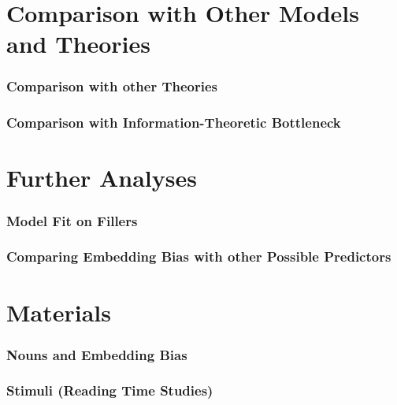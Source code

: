 \documentclass[11pt,a4paper]{article}
\begin{document}
\newpage
\part{Comparison with Other Models and Theories}


\section{Comparison with other Theories}\label{sec:other-theories}



\newpage
\section{Comparison with Information-Theoretic Bottleneck}






\newpage
\part{Further Analyses}


\section{Model Fit on Fillers}





\newpage
\section{Comparing Embedding Bias with other Possible Predictors}\label{sec:other-possible-predictors}




\newpage
\part{Materials}


\section{Nouns and Embedding Bias}\label{sec:nouns}




\newpage
\section{Stimuli (Reading Time Studies)}\label{sec:stimulus-pool}
\end{document}

